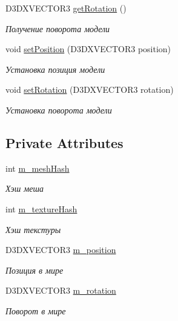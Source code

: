 \begin{DoxyCompactItemize}
D3\+D\+X\+V\+E\+C\+T\+O\+R3 \hyperlink{class_model_class_a4c89a288f58e5193179d455c0e24318b}{get\+Rotation} ()
\begin{DoxyCompactList}\small\item\em Получение поворота модели \end{DoxyCompactList}\item 
void \hyperlink{class_model_class_a603505b7b8b00248d6fea39a2c133f0e}{set\+Position} (D3\+D\+X\+V\+E\+C\+T\+O\+R3 position)
\begin{DoxyCompactList}\small\item\em Установка позиция модели \end{DoxyCompactList}\item 
void \hyperlink{class_model_class_a80ee72427b5d897e422ac0a62a722fc4}{set\+Rotation} (D3\+D\+X\+V\+E\+C\+T\+O\+R3 rotation)
\begin{DoxyCompactList}\small\item\em Установка поворота модели \end{DoxyCompactList}\end{DoxyCompactItemize}
\subsection*{Private Attributes}
\begin{DoxyCompactItemize}
\item 
int \hyperlink{class_model_class_ad93a0cca424771ab37024e5d2ec7268f}{m\+\_\+mesh\+Hash}
\begin{DoxyCompactList}\small\item\em Хэш меша \end{DoxyCompactList}\item 
int \hyperlink{class_model_class_a7ac5fd4bd5dde084256bcccf1d0a2827}{m\+\_\+texture\+Hash}
\begin{DoxyCompactList}\small\item\em Хэш текстуры \end{DoxyCompactList}\item 
D3\+D\+X\+V\+E\+C\+T\+O\+R3 \hyperlink{class_model_class_a38909735986bc1efe5a64bf921b759f7}{m\+\_\+position}
\begin{DoxyCompactList}\small\item\em Позиция в мире \end{DoxyCompactList}\item 
D3\+D\+X\+V\+E\+C\+T\+O\+R3 \hyperlink{class_model_class_adbeac264bd99cedbe00f3ca03f546209}{m\+\_\+rotation}
\begin{DoxyCompactList}\small\item\em Поворот в мире \end{DoxyCompactList}\end{DoxyCompactItemize}


